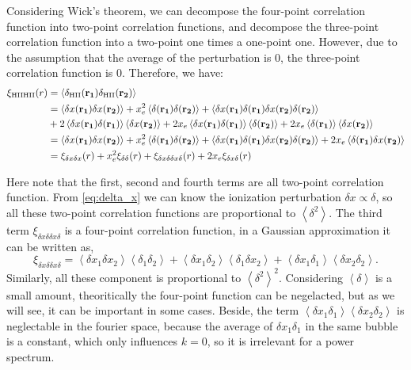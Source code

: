 Considering Wick's theorem, we can decompose the four-point correlation function into two-point correlation functions, and decompose the three-point correlation function into a two-point one times a one-point one. However, due to the assumption that the average of the perturbation is 0, the three-point correlation function is 0. Therefore, we have:
	\begin{align}
		\xi_{\text{HII}\text{HII}}(r) &= \left<
			\delta_{\text{HII}}(\mathbf{r_1})\delta_{\text{HII}}(\mathbf{r_2})
		\right>
		\notag\\
		&=
		\left<
			\delta x(\mathbf{r_1})\delta x(\mathbf{r_2})
		\right>
		+x_e^2
		\left<
			\delta(\mathbf{r_1})\delta(\mathbf{r_2})
		\right>
		+\left<
			\delta x(\mathbf{r_1})\delta(\mathbf{r_1})
			\delta x(\mathbf{r_2})\delta(\mathbf{r_2})
		\right>
		\notag\\
		&+
		2\left<
			\delta x(\mathbf{r_1})\delta(\mathbf{r_1})
		\right>\left<
			\delta x(\mathbf{r_2})
		\right>
		+2x_e\left<
		\delta x(\mathbf{r_1})\delta(\mathbf{r_1})
		\right>\left<
		\delta (\mathbf{r_2})
		\right>
		+2x_e\left<
		\delta(\mathbf{r_1})\right>\left<\delta x(\mathbf{r_2})
		\right>
		\notag\\
		&=\left<
			\delta x(\mathbf{r_1})\delta x(\mathbf{r_2})
		\right>
		+x_e^2
		\left<
			\delta(\mathbf{r_1})\delta(\mathbf{r_2})
		\right>
		+\left<
			\delta x(\mathbf{r_1})\delta(\mathbf{r_1})
			\delta x(\mathbf{r_2})\delta(\mathbf{r_2})
		\right>
		+2x_e\left<
			\delta(\mathbf{r_1})\delta x(\mathbf{r_2})
		\right>
		\notag\\
		&=
		\xi_{\delta x\delta x}(r)
		+x_e^2\xi_{\delta\delta}(r)
		+\xi_{\delta x \delta \delta x \delta}(r)
		+2 x_e\xi_{\delta x\delta}(r)
	\end{align}	

Here note that the first, second and fourth terms are all two-point correlation function. From \eqref{eq:delta_x} we can know the ionization perturbation $\delta x \propto \delta$, so all these two-point correlation functions are proportional to $\left<\delta^2\right>$. The third term $\xi_{\delta x\delta\delta x\delta}$ is a four-point correlation function, in a Gaussian approximation it can be written as,
\[
\xi_{\delta x\delta\delta x\delta} 
= \left<\delta x_1 \delta x_2\right>\left<\delta_1 \delta_2\right>
+ \left<\delta x_1 \delta_2\right>\left<\delta_1 \delta x_2\right>
+ \left<\delta x_1 \delta_1\right>\left<\delta x_2 \delta_2\right>.
\]
Similarly, all these component is proportional to $\left<\delta^2\right>^2$. Considering $\left<\delta\right>$ is a small amount, theoritically the four-point function can be negelacted, but as we will see, it can be important in some cases. Beside, the term $\left<\delta x_1 \delta_1\right>\left<\delta x_2 \delta_2\right>$ is neglectable in the fourier space, because the average of $\delta x_1 \delta_1$ in the same bubble is a constant, which only influences $k=0$, so it is irrelevant for a power spectrum.
